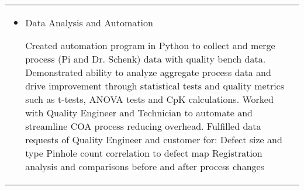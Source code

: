 \documentclass[a4paper, oneside, final, fontsize=9pt, usegeometry]{scrartcl} %
\begin{document}
\begin{center}
\begin{tabularx}{0.97\linewidth}{XX}
\begin{itemize}
\begin{sloppypar}
        \end{sloppypar}
        \item{Data Analysis and Automation}
        \begin{sloppypar}
            Created automation program in Python to collect and merge process (Pi and Dr. Schenk) data with quality bench data. Demonstrated ability to analyze aggregate process data and drive improvement through statistical tests and quality metrics such as t-tests, ANOVA tests and CpK calculations. Worked with Quality Engineer and Technician to automate and streamline COA process reducing overhead. Fulfilled data requests of Quality Engineer and customer for: Defect size and type Pinhole count correlation to defect map Registration analysis and comparisons before and after process changes
        \end{sloppypar}
    \end{itemize}
\end{tabularx}

\vspace{-8pt}


\end{center}
\end{document}
